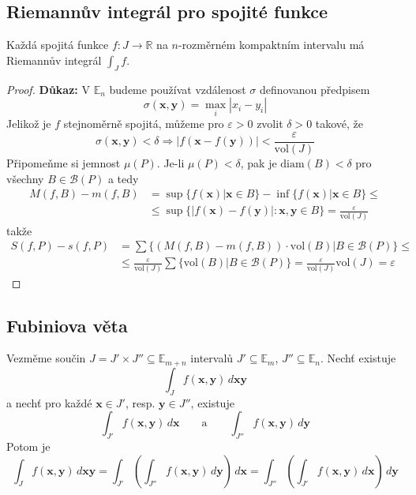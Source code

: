 \documentclass[../main.tex]{subfiles}
\begin{document}
\subsection{Riemannův integrál pro spojité funkce}
\begin{theorem}
	Každá spojitá funkce $f: J \to \mathbb{R}$ na $n$-rozměrném kompaktním intervalu má Riemannův integrál
	$\int_{J}f$.
\end{theorem}

\begin{proof}
	\textbf{Důkaz:}
	V $\mathbb{E}_n$ budeme používat vzdálenost $\sigma$ definovanou předpisem
	\[ \sigma (\mathbf{x}, \mathbf{y}) = \max_{i} |x_i - y_i| \]
	Jelikož je $f$ stejnoměrně spojitá, můžeme pro $\varepsilon > 0$ zvolit $\delta > 0$ takové, že
	\[ \sigma (\mathbf{x}, \mathbf{y}) < \delta \Rightarrow
	|f(\mathbf{x} - f(\mathbf{y}))| < \frac{\varepsilon}{\textrm{vol}(J)} \]
	Připomeňme si jemnost $\mu (P)$. Je-li $\mu (P) < \delta$, pak je $\textrm{diam}(B) < \delta$ pro všechny
	$ B \in \mathcal{B}(P) $ a tedy
	\begin{align*}
			M(f, B) - m(f, B) &= \sup\{ f(\mathbf{x})|\mathbf{x} \in B \} -
			\inf\{ f(\mathbf{x})|\mathbf{x} \in B\}\leq\\
			&\leq \sup\{ |f(\mathbf{x}) - f(\mathbf{y})|: \mathbf{x}, \mathbf{y} \in B \}
			= \frac{\varepsilon}{\textrm{vol}(J)}
	\end{align*}
	takže
	\begin{align*}
			S(f,P) - s(f,P) &= \sum \{ (M(f,B) - m(f,B))\cdot \textrm{vol}(B)|B\in \mathcal{B}(P) \}\leq\\
			&\leq \frac{\varepsilon}{\textrm{vol}(J)}\sum \{ \textrm{vol}(B)| B\in \mathcal{B}(P) \}
			= \frac{\varepsilon}{\textrm{vol}(J)}\textrm{vol}(J) = \varepsilon
	\end{align*}
\end{proof}

\subsection{Fubiniova věta}
\begin{theorem}
	Vezměme součin $J = J' \times J'' \subseteq \mathbb{E}_{m+n}$ intervalů $J' \subseteq \mathbb{E}_m$,
	$J'' \subseteq \mathbb{E}_n$. Nechť existuje
	\[ \int_{J} f(\mathbf{x}, \mathbf{y}) \,d\mathbf{xy} \]
	a nechť pro každé $\mathbf{x} \in J'$, resp. $\mathbf{y} \in J''$, existuje
	\[ \int_{J'} f(\mathbf{x}, \mathbf{y}) \,d\mathbf{x} \qquad \text{a} \qquad \int_{J''} f(\mathbf{x}, \mathbf{y}) \,d\mathbf{y} \]
	Potom je
	\[ \int_J f(\mathbf{x}, \mathbf{y}) \,d\mathbf{xy} =
	\int_{J'} \left( \int_{J''} f(\mathbf{x}, \mathbf{y}) \,d\mathbf{y} \right) \,d\mathbf{x} = 
	\int_{J''} \left( \int_{J'} f(\mathbf{x}, \mathbf{y}) \,d\mathbf{x} \right) \,d\mathbf{y}\]
\end{theorem}
\end{document}

